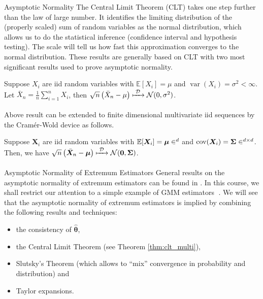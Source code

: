 \documentclass[envcountsect,usenames,dvipsnames]{beamer}
\DeclareMathOperator*{\cov}{cov}
\DeclareMathOperator*{\var}{var}
\def\btheta{\bm \theta}
\theoremstyle{mystyle}
\begin{document}
\begin{frame}{Asymptotic Normality}
\footnotesize
   The Central Limit Theorem (CLT) takes one step further than the law of large number. It identifies the limiting distribution of the (properly scaled) sum of random variables as the normal distribution, which allows us to do the statistical inference (confidence interval and hypothesis testing). The scale will tell us how fast this approximation converges to the normal distribution. These results are generally based on CLT with two most significant results used to prove asymptotic normality. 
   
   \begin{Theorem}
	\label{thm:clt}
		Suppose $X_i$ are iid random variables with $\mathbb{E}[X_i] = \mu$ and $\var(X_i) = \sigma^2 < \infty$. Let $\bar{X}_n = \frac{1}{n} \sum_{i = 1}^n X_i$, then $\sqrt{n}\left(\bar{X}_n - \mu\right) \xmapsto[\;\;\;\;\; ]{\mathcal{D}} \mathcal{N}(0, \sigma^2)$.
	\end{Theorem}
	
	Above result can be extended to finite dimensional multivariate iid sequences by the Cram\'er-Wold device as follows.
	
	\begin{Theorem}
	\label{thm:clt_multi}
		Suppose $\bm{X}_i$ are iid random variables with $\mathbb{E}[\bm{X}_i] = \bm{\mu} \in \real^d$ and $\cov(\bm{X}_i) = \bm{\Sigma} \in \real^{d \times d}$. Then, we have $\sqrt{n}\left(\bar{\bm{X}}_n - \bm{\mu}\right) \xmapsto[\;\;\;\;\; ]{\mathcal{D}} \mathcal{N}(\bm{0}, \bm{\Sigma})$.
	\end{Theorem}
\end{frame}

\begin{frame}{Asymptotic Normality of Extremum Estimators}
\small
   General results on the asymptotic normality of extremum estimators can be found in \cite{newey1994vlarge}. In this course, we shall restrict our attention to a simple example of GMM estimators  $\;$\hyperlink{ex:gmm}{}. We will see that the asymptotic normality of extremum estimators is implied by combining the following results and techniques:
   \begin{itemize}
       \item the consistency of $\hat{\btheta}$,
       \item the Central Limit Theorem (see Theorem \ref{thm:clt_multi}),
       \item Slutsky's Theorem (which allows to ``mix'' convergence in probability and distribution) and 
       \item Taylor expansions.
   \end{itemize}
   \end{frame}
\end{document}

